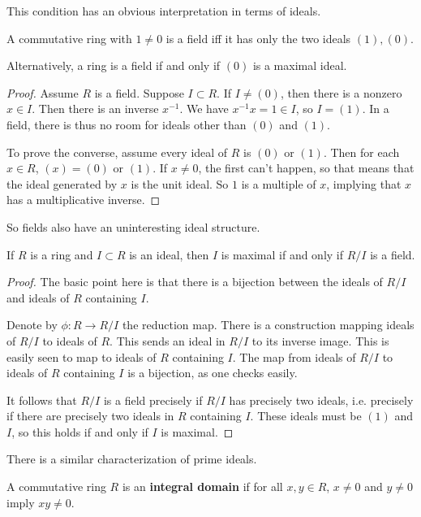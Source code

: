 This condition has an obvious interpretation in terms of ideals.
\begin{proposition} 
A commutative ring with $1 \neq 0$ is a field iff it has only the two ideals $(1),
(0)$.
\end{proposition} 

Alternatively, a ring is a field if and only if $(0)$ is a maximal ideal.

\begin{proof} 
Assume $R$ is a field.  Suppose $I \subset R$.  If $I \neq (0)$, then there is
a nonzero $x \in I$. Then there is an inverse $x^{-1}$. We have $x^{-1} x =1
\in I$, so $I = (1)$.
In a field, there is thus 	no room for ideals other than $(0)$ and $(1)$.

To prove the converse, assume every ideal of $R$ is $(0)$ or $(1)$. Then for
each $x \in R$, $(x) = (0)$ or $(1)$. If $x \neq 0$, the first can't happen, so
that means that the ideal generated by $x$ is the unit ideal. So $1$ is a
multiple of $x$, implying that $x$ has a multiplicative inverse.
\end{proof} 

So fields also have an uninteresting ideal structure.

\begin{corollary} \label{maximalfield}
If $R$ is a ring and $I \subset R$ is an ideal, then $I$ is maximal if and only
if $R/I$ is a field.
\end{corollary} 

\begin{proof}
The basic point here is that there is a bijection between the ideals of $R/I$
and ideals of $R$ containing $I$. 

Denote  by $\phi: R \to R/I$ the reduction map. There is a
construction mapping ideals of $R/I$ to ideals of $R$. This sends an ideal in
$R/I$ to
its inverse image.  This is easily seen to map to ideals of $R$ containing $I$.
The map from ideals of $R/I$ to ideals of $R$ containing $I$ is a bijection,
as one checks easily.

It follows that $R/I$ is a field precisely if
$R/I$ has precisely two ideals, i.e. precisely if there are precisely two
ideals in $R$ containing $I$. These ideals must be $(1)$ and $I$, so this
holds if and only if $I$ is maximal.
\end{proof} 

There is a similar characterization of prime ideals.

\begin{definition} 
A commutative ring $R$ is an \textbf{integral domain} if for all $ x,y \in R$,
$x \neq 0 $ and $y \neq 0$ imply $xy \neq 0$.
\end{definition} 

